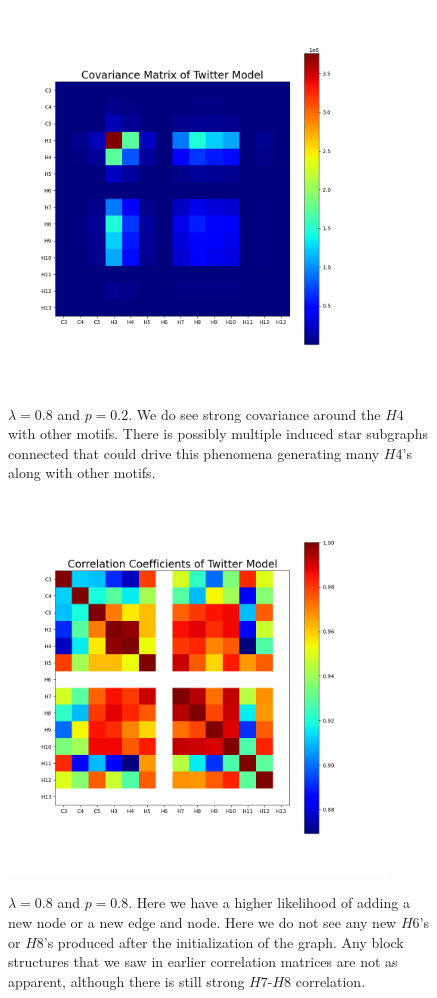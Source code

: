 \begin{figure}
    \includegraphics[width=10cm]{Images/CovMatTwitterModel080209.png}\
    \centering
    \caption{$\lambda=0.8$ and $p=0.2$. We do see strong covariance around the $H4$ with 
    other motifs. There is possibly multiple induced star subgraphs connected that could
    drive this phenomena generating many $H4$'s along with other motifs.}
    \label{fig:covmat0802}
\end{figure}

\begin{figure}
    \includegraphics[width=10cm]{Images/CorrCoefTwitterModel080809.png}\
    \centering
    \caption{$\lambda=0.8$ and $p=0.8$. Here we have a higher likelihood of adding a new node
     or a new edge and node. Here we do not see any new $H6$'s or $H8$'s produced after the initialization of 
     the graph. Any block structures that we saw in earlier correlation matrices are not as apparent, although
     there is still strong $H7$-$H8$ correlation. }
     \label{fig:corrmat0808}
\end{figure}

